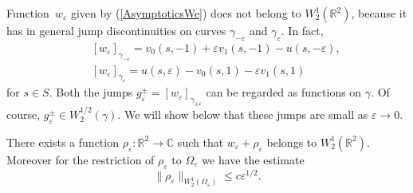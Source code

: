 \documentclass[graybox]{svmult}
\newcommand{\Real}{\mathbb R}
\newcommand{\Cmpl}{\mathbb C}
\newcommand{\eps}{\varepsilon}
\renewcommand{\leq}{\leqslant}
\newcommand{\eqref}[1]{(\ref{#1})}
\begin{document}
Function~$w_\eps$ given by \eqref{AsymptoticsWe} does not
belong to $W_2^1(\Real^2)$, because it has  in general  jump discontinuities on curves  $\gamma_{-\eps}$ and $\gamma_\eps$.
In fact,
\begin{eqnarray}\nonumber
&&[w_\eps]_{\gamma_{-\eps}}=v_0(s,-1)+\eps v_1(s,-1)-u(s,-\eps),\\
&&[w_\eps]_{\gamma_{\eps}}=u(s,\eps)-v_0(s,1)-\eps v_1(s,1)
\end{eqnarray}
for $s\in S$. Both the jumps $g_\eps^\pm=[w_\eps]_{\gamma_{\pm\eps}}$ can be regarded as  functions on $\gamma$. Of course, $g_\eps^\pm\in W_2^{1/2}(\gamma)$.
We will show below that these jumps are small as $\eps\to 0$.

\begin{proposition}\label{PropW21Corrector}
There exists a function $\rho_\eps\colon \Real^2\to \Cmpl$ such that $w_\eps+\rho_\eps$ belongs to $W_2^1(\Real^2)$. Moreover for the restriction of $\rho_\eps$ to $\Omega_\eps$  we have the estimate
\begin{equation}\label{EstRhoEps}
\|\rho_\eps\|_{W_2^1(\Omega_\eps)}\leq c \eps^{1/2}.
\end{equation}
\end{proposition}
\end{document}
